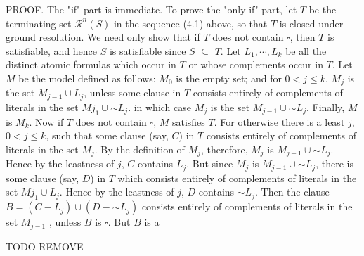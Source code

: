 \documentclass[8pt]{extarticle}
\begin{document}
PROOF. The "if" part is immediate. To prove the "only if" part, let $T$ be the
terminating set $\mathscr{R}^n(S)$ in the sequence (4.1) above, so that $T$ is closed under ground resolution. We need only show that if $T$ does not contain $\square$, then $T$ is satisfiable, and hence $S$ is satisfiable since $S$ $\subseteq$ $T$. Let $L_1, \dotsm , L_k$ be all the distinct atomic formulas which occur in $T$ or whose complements occur in $T$. Let $M$ be the model defined as follows: $M_0$ is the empty set; and for $0 < j \leq k$, $M_j$ is the set $M_{j-1} \cup {L_j}$, unless some clause in $T$ consists entirely of complements of literals in the set $M{j_1}\cup{\sim L_j}$. in which case $M_j$ is the set $M_{j-1}\cup{\sim L_j}$. Finally, $M$ is $M_k$. Now if $T$ does not contain $\square$, $M$ satisfies $T$. For otherwise there is a least $j$, $0 < j \leq k$, such that some clause (say, $C$) in $T$ consists entirely of complements of literals in the set $M_j$. By the definition of $M_j$, therefore, $M_j$ is $M_{j-1} \cup {\sim L_j}$. Hence by the leastness of $j$, $C$ contains $L_j$. But since $M_j$ is $M_{j-1}\cup {\sim L_j}$, there is some clause (say, $D$) in $T$ which consists entirely of complements of literals in the set $M{j_1}\cup {L_j}$. Hence by the leastness of $j$, $D$ contains $\sim L_j$. Then the clause $B = (C - {L_j}) \cup (D - {\sim L_j})$ consists entirely of complements of literals in the set $M_{j-1}$ , unless $B$ is $\square$. But $B$ is a

\newpage

TODO REMOVE
\cite{church_1936}
\cite{davis_1960}
\cite{friedman_1963}
\cite{gilmore_1960}
\cite{robinson_1963}



\end{document}
